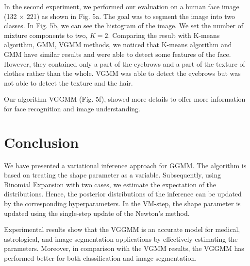 \documentclass[conference]{IEEEtran}
\begin{document}
In the second experiment, we performed our evaluation on a human face image (132 × 221) as shown in Fig. 5a. The goal was to segment the image into two classes. In Fig. 5b, we can see the histogram of the image. 
We set the number of mixture components to two, $K=2$.
Comparing the result with K-means algorithm, GMM, VGMM methods, we noticed that K-means algorithm and GMM have similar results and were able to detect some features of the face. However, they contained only a part of the eyebrows and a part of the texture of clothes rather than the whole. 
VGMM was able to detect the eyebrows but was not able to detect the texture and the hair. 

Our algorithm VGGMM (Fig. 5f), showed more details to offer more information for face recognition and image understanding.

\section{Conclusion}
We have presented a variational inference approach for GGMM. The algorithm is based on treating the shape parameter as a variable. Subsequently, using Binomial Expansion with two cases, we estimate the expectation of the distributions. Hence, the posterior distributions of the inference can be updated by the corresponding hyperparameters.
In the VM-step, the shape parameter is updated using the single-step update of the Newton’s method.


Experimental results show that the VGGMM is an accurate model for medical, astrological, and image segmentation applications by effectively estimating the parameters.
Moreover, in comparison with the VGMM results, the VGGMM has performed better for both classification and image segmentation. 


\end{document}
